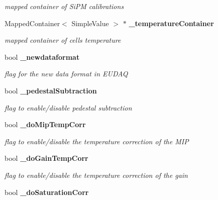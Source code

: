 \begin{DoxyCompactItemize}
\begin{DoxyCompactList}\small\item\em mapped container of SiPM calibrations \item\end{DoxyCompactList}\item 
MappedContainer$<$ SimpleValue $>$ $\ast$ {\bf \_\-temperatureContainer}\label{classCALICE_1_1Ahc2CalibrateProcessor_a8f227d17ea78bb5f560d695725099e93}

\begin{DoxyCompactList}\small\item\em mapped container of cells temperature \item\end{DoxyCompactList}\item 
bool {\bf \_\-newdataformat}\label{classCALICE_1_1Ahc2CalibrateProcessor_a8bae2aa3700e81f9f739a3d64c3e7cbb}

\begin{DoxyCompactList}\small\item\em flag for the new data format in EUDAQ \item\end{DoxyCompactList}\item 
bool {\bf \_\-pedestalSubtraction}\label{classCALICE_1_1Ahc2CalibrateProcessor_aad858c334434d3f75b9d993aaf60f076}

\begin{DoxyCompactList}\small\item\em flag to enable/disable pedestal subtraction \item\end{DoxyCompactList}\item 
bool {\bf \_\-doMipTempCorr}\label{classCALICE_1_1Ahc2CalibrateProcessor_ac36692611bc1dc16e7b613f0f279121b}

\begin{DoxyCompactList}\small\item\em flag to enable/disable the temperature correction of the MIP \item\end{DoxyCompactList}\item 
bool {\bf \_\-doGainTempCorr}\label{classCALICE_1_1Ahc2CalibrateProcessor_a3d46c30741845b340de59f9b5fd5de40}

\begin{DoxyCompactList}\small\item\em flag to enable/disable the temperature correction of the gain \item\end{DoxyCompactList}\item 
bool {\bf \_\-doSaturationCorr}\label{classCALICE_1_1Ahc2CalibrateProcessor_a40d7fce6e7e82cb810b6c0a7e016a74d}


\end{DoxyCompactItemize}
